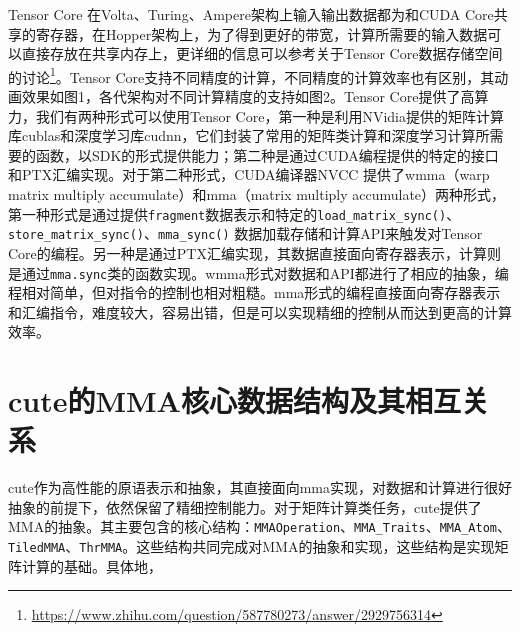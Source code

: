 Tensor Core 在Volta、Turing、Ampere架构上输入输出数据都为和CUDA Core共享的寄存器，在Hopper架构上，为了得到更好的带宽，计算所需要的输入数据可以直接存放在共享内存上，更详细的信息可以参考关于Tensor Core数据存储空间的讨论\footnote{\url{https://www.zhihu.com/question/587780273/answer/2929756314}}。Tensor Core支持不同精度的计算，不同精度的计算效率也有区别，其动画效果如图1，各代架构对不同计算精度的支持如图2。Tensor Core提供了高算力，我们有两种形式可以使用Tensor Core，第一种是利用NVidia提供的矩阵计算库cublas和深度学习库cudnn，它们封装了常用的矩阵类计算和深度学习计算所需要的函数，以SDK的形式提供能力；第二种是通过CUDA编程提供的特定的接口和PTX汇编实现。对于第二种形式，CUDA编译器NVCC 提供了wmma（warp matrix multiply accumulate）和mma（matrix multiply accumulate）两种形式，第一种形式是通过提供\verb|fragment|数据表示和特定的\verb|load_matrix_sync()|、\verb|store_matrix_sync()|、\verb|mma_sync()| 数据加载存储和计算API来触发对Tensor Core的编程。另一种是通过PTX汇编实现，其数据直接面向寄存器表示，计算则是通过\verb|mma.sync|类的函数实现。wmma形式对数据和API都进行了相应的抽象，编程相对简单，但对指令的控制也相对粗糙。mma形式的编程直接面向寄存器表示和汇编指令，难度较大，容易出错，但是可以实现精细的控制从而达到更高的计算效率。

\section{cute的MMA核心数据结构及其相互关系}

cute作为高性能的原语表示和抽象，其直接面向mma实现，对数据和计算进行很好抽象的前提下，依然保留了精细控制能力。对于矩阵计算类任务，cute提供了MMA的抽象。其主要包含的核心结构：\verb|MMAOperation|、\verb|MMA_Traits|、\verb|MMA_Atom|、\verb|TiledMMA|、\verb|ThrMMA|。这些结构共同完成对MMA的抽象和实现，这些结构是实现矩阵计算的基础。具体地，

